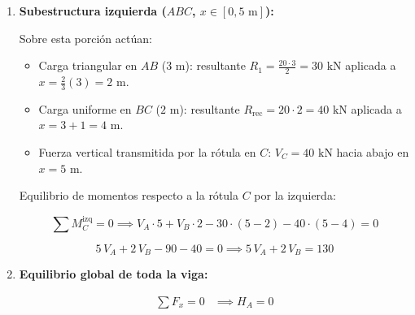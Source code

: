 \begin{enumerate}
\begin{equation}
          \end{equation}

          Por el principio de acción y reacción, la rótula transmite a la chapa izquierda una fuerza descendente hacia abajo de $40\text{ kN}$ en $x = 5\text{ m}$.



    \item \textbf{Subestructura izquierda ($ABC$, $x \in [0, 5\text{ m}]$):}

          Sobre esta porción actúan:

          \begin{itemize}

              \item Carga triangular en $AB$ ($3\text{ m}$): resultante $R_1 = \frac{20 \cdot 3}{2} = 30\text{ kN}$ aplicada a $x = \frac{2}{3}(3) = 2\text{ m}$.

              \item Carga uniforme en $BC$ ($2\text{ m}$): resultante $R_{\text{rec}} = 20 \cdot 2 = 40\text{ kN}$ aplicada a $x = 3 + 1 = 4\text{ m}$.

              \item Fuerza vertical transmitida por la rótula en $C$: $V_C = 40\text{ kN}$ hacia abajo en $x = 5\text{ m}$.

          \end{itemize}

          Equilibrio de momentos respecto a la rótula $C$ por la izquierda:

          \begin{equation}

              \sum M_C^{\text{izq}} = 0 \implies V_A \cdot 5 + V_B \cdot 2 - 30 \cdot (5 - 2) - 40 \cdot (5 - 4) = 0

          \end{equation}

          \begin{equation}

              5\,V_A + 2\,V_B - 90 - 40 = 0 \implies 5\,V_A + 2\,V_B = 130

          \end{equation}



    \item \textbf{Equilibrio global de toda la viga:}

          \begin{align}

              \sum F_x = 0 & \implies \boxed{H_A = 0}                                                                           \\


\end{align}
\end{enumerate}
